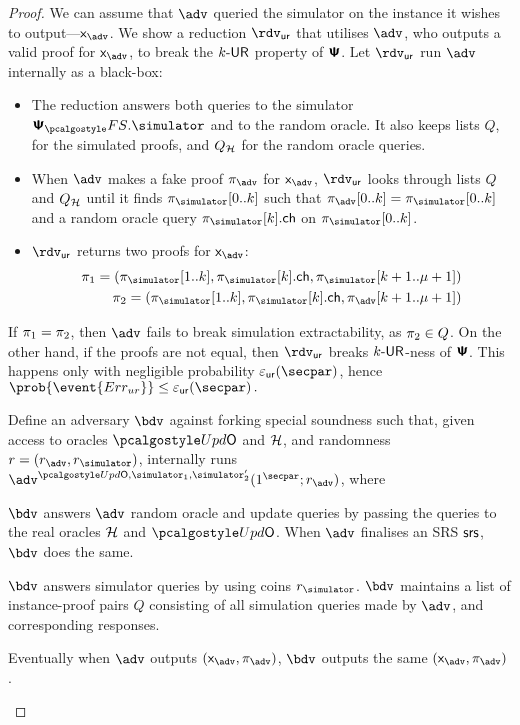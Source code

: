 \begin{proof}
{		We can assume that $\advse$ queried the simulator on the instance it wishes to
		output---$\inp_{\advse}$. We show a reduction $\rdvur$ that utilises $\advse$,
		who outputs a valid proof for $\inp_{\advse}$, to break the ${k\text{-}\mathsf{UR}}$ property of
		$\bm{\mathsf{\Psi}}$. Let $\rdvur$ run $\advse$ internally as a black-box:
		\begin{itemize}
			\item The reduction answers both queries to the simulator $\psfs.\simulator$ and to the random oracle. 
			It also keeps lists $Q$, for the simulated proofs, and $Q_{\mathcal{H}}$ for the random oracle queries. 
			\item When $\advse$ makes a fake proof $\zkproof_{\advse}$ for $\inp_{\advse}$,
			$\rdvur$ looks through lists $Q$ and $Q_{\mathcal{H}}$ until it finds
			$\zkproof_{\simulator}[0..k]$ such that
			$\zkproof_{\advse}[0..k] = \zkproof_{\simulator}[0..k]$
			and a random oracle query $\zkproof_{\simulator}[k].\ch$ on
			$\zkproof_{\simulator}[0..k]$.
			\item $\rdvur$ returns two proofs for $\inp_{\advse}$:
			\begin{align*}
			\zkproof_1 = (\zkproof_{\simulator}[1..k],
			\zkproof_{\simulator}[k].\ch, \zkproof_{\simulator}[k + 1..\mu + 1])\\
			\zkproof_2 = (\zkproof_{\simulator}[1..k],
			\zkproof_{\simulator}[k].\ch, \zkproof_{\advse}[k + 1..\mu + 1])
			\end{align*}
		\end{itemize}  
		If $\pi_1 = \pi_2$, then $\advse$ fails to break simulation
		extractability, as $\pi_2 \in Q$. On the other hand, if the proofs are
		not equal, then $\rdvur$ breaks ${k\text{-}\mathsf{UR}}$-ness of $\bm{\mathsf{\Psi}}$. This happens only with
		negligible probability $\epsur(\secpar)$, hence \( \prob{\event{\errur}} \leq
		\epsur(\secpar)\,. \)
	}
	 Define an adversary $\bdv$ against forking special soundness such that,
	given access to oracles $\initU$ and $\mathcal{H}$, and randomness $r = (r_\adv, \rsim)$,
	internally runs $\advse^{\initU, \simulator_1, \simulator_2'} (1^\secpar; r_\adv)$,
	where
	\begin{compactenum}
		\item $\bdv$ answers $\adv$ random oracle and update queries by passing the queries to the real
		oracles $\mathcal{H}$ and $\initU$. When $\adv$ finalises an SRS $\mathsf{srs}$, $\bdv$ does the same.
		\item $\bdv$ answers simulator queries by using coins $\rsim$. $\bdv$ maintains a
		list of instance-proof pairs $Q$ consisting of all simulation queries made by
		$\adv$, and corresponding responses.
		\item Eventually when $\adv$ outputs $(\inp_\advse, \zkproof_\advse)$, $\bdv$ outputs
		the same $(\inp_\advse, \zkproof_\advse)$.
	\end{compactenum}
	

\end{proof}
